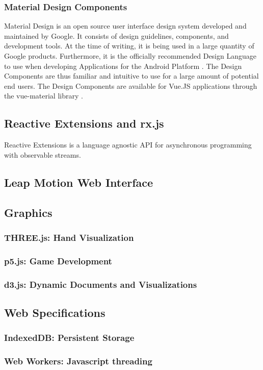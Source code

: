 \subsubsection{Material Design Components}
Material Design is an open source user interface design system developed and maintained by Google. It consists of design guidelines, components, and development tools. At the time of writing, it is being used in a large quantity of Google products. Furthermore, it is the officially recommended Design Language to use when developing Applications for the Android Platform \cite{AndroidAppQualityGuidelines}. The Design Components are thus familiar and intuitive to use for a large amount of potential end users. The Design Components are available for Vue.JS applications through the vue-material library \cite{VueMaterial}.
\subsection{Reactive Extensions and rx.js}
Reactive Extensions is a language agnostic API for asynchronous programming with observable streams.
\subsection{Leap Motion Web Interface}
\subsection{Graphics}
\subsubsection{THREE.js: Hand Visualization}
\subsubsection{p5.js: Game Development}
\subsubsection{d3.js: Dynamic Documents and Visualizations}
\subsection{Web Specifications}
\subsubsection{IndexedDB: Persistent Storage}
\subsubsection{Web Workers: Javascript threading}
